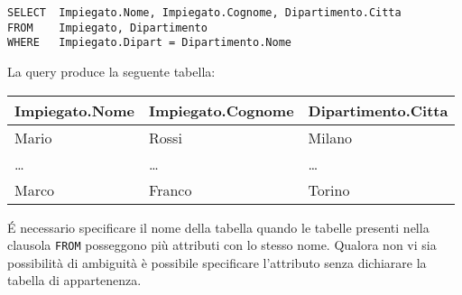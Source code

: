 \begin{lstlisting}
SELECT	Impiegato.Nome, Impiegato.Cognome, Dipartimento.Citta
FROM	Impiegato, Dipartimento
WHERE	Impiegato.Dipart = Dipartimento.Nome
\end{lstlisting}

La query produce la seguente tabella:

\begin{center}
	\begin{tabular}{@{} l l l @{}}
		\toprule
			Impiegato.Nome	& Impiegato.Cognome & Dipartimento.Citta \\
		\midrule
			Mario			& Rossi				& Milano \\
			\dots			& \dots				& \dots \\
			Marco			& Franco			& Torino \\
		\bottomrule
	\end{tabular}
\end{center}

\'E necessario specificare il nome della tabella quando le tabelle presenti nella clausola \texttt{FROM} posseggono più attributi con lo stesso nome. Qualora non vi sia possibilità di ambiguità è possibile specificare l'attributo senza dichiarare la tabella di appartenenza.

